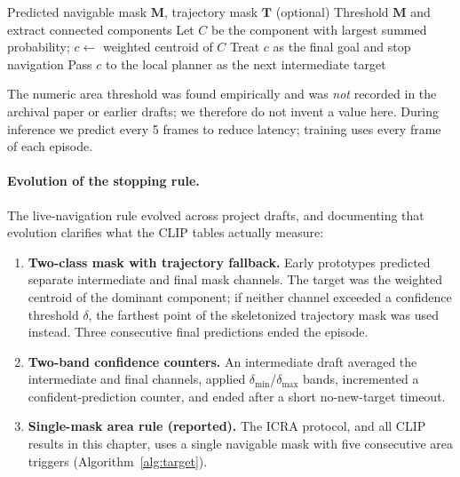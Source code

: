 \begin{algorithm}[ht]
\caption{Target determination for live navigation (CLIP-family protocol)}
\label{alg:target}
\begin{algorithmic}[1]
\Require Predicted navigable mask $\mathbf{M}$, trajectory mask $\mathbf{T}$ (optional)
\State Threshold $\mathbf{M}$ and extract connected components
\State Let $C$ be the component with largest summed probability; $c \leftarrow$ weighted centroid of $C$
    \State Treat $c$ as the final goal and stop navigation
\Else
    \State Pass $c$ to the local planner as the next intermediate target
\EndIf
\end{algorithmic}
\end{algorithm}

The numeric area threshold was found empirically and was \emph{not} recorded in the archival paper or earlier drafts; we therefore do not invent a value here. During inference we predict every 5 frames to reduce latency; training uses every frame of each episode.

\paragraph{Evolution of the stopping rule.}
The live-navigation rule evolved across project drafts, and documenting that evolution clarifies what the CLIP tables actually measure:
\begin{enumerate}
    \item \textbf{Two-class mask with trajectory fallback.} Early prototypes predicted separate intermediate and final mask channels. The target was the weighted centroid of the dominant component; if neither channel exceeded a confidence threshold $\delta$, the farthest point of the skeletonized trajectory mask was used instead. Three consecutive final predictions ended the episode.
    \item \textbf{Two-band confidence counters.} An intermediate draft averaged the intermediate and final channels, applied $\delta_{\min}$/$\delta_{\max}$ bands, incremented a confident-prediction counter, and ended after a short no-new-target timeout.
    \item \textbf{Single-mask area rule (reported).} The ICRA protocol, and all CLIP results in this chapter, uses a single navigable mask with five consecutive area triggers (Algorithm~\ref{alg:target}).
\end{enumerate}

